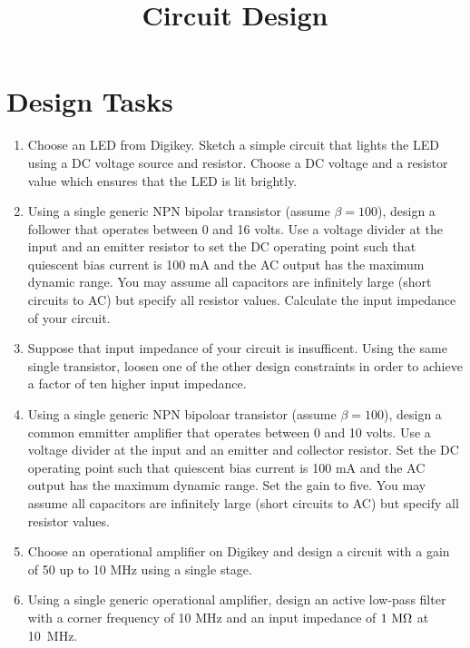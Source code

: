 \documentclass[12pt]{article}
\begin{document}

\title{Circuit Design}

\maketitle


\section{Design Tasks}
\begin{enumerate}
\item Choose an LED from Digikey.  Sketch a simple circuit that lights
  the LED using a DC voltage source and resistor.  Choose a DC voltage
  and a resistor value which ensures that the LED is lit brightly.

\item Using a single generic NPN bipolar transistor (assume
  $\beta=100$), design a follower that operates between 0 and 16
  volts.  Use a voltage divider at the input and an emitter resistor
  to set the DC operating point such that quiescent bias current is
  100 mA and the AC output has the maximum dynamic range.  You may
  assume all capacitors are infinitely large (short circuits to AC)
  but specify all resistor values.  Calculate the input impedance of
  your circuit.

\item Suppose that input impedance of your circuit is insufficent.
  Using the same single transistor, loosen one of the other design
  constraints in order to achieve a factor of ten higher input
  impedance.

\item Using a single generic NPN bipoloar transistor (assume
  $\beta=100$), design a common emmitter amplifier that operates
  between 0 and 10 volts.  Use a voltage divider at the input and an
  emitter and collector resistor.  Set the DC operating point such
  that quiescent bias current is 100 mA and the AC output has the
  maximum dynamic range.  Set the gain to five.  You may assume all
  capacitors are infinitely large (short circuits to AC) but specify
  all resistor values.

\item Choose an operational amplifier on Digikey and design a circuit
  with a gain of 50 up to 10 MHz using a single stage.
  
\item Using a single generic operational amplifier, design an active
  low-pass filter with a corner frequency of 10 MHz and an input
  impedance of $1~\rm M\Omega$ at 10~MHz.


\end{enumerate}
\end{document}
